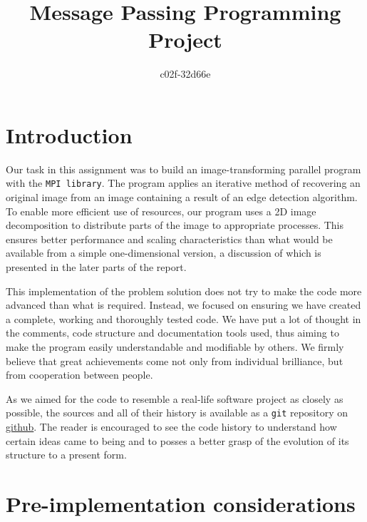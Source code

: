 \documentclass[11pt,a4paper]{article}
\begin{document}
\title{Message Passing Programming Project}
\author{c02f-32d66e}
\maketitle

\section{Introduction}
Our task in this assignment was to build an image-transforming parallel program with the \texttt{MPI library}.
The program applies an iterative method of recovering an original image from an image containing a result of an edge detection algorithm. 
To enable more efficient use of resources, our program uses a 2D image decomposition to distribute parts of the image to appropriate processes. 
This ensures better performance and scaling characteristics than what would be available from a simple one-dimensional version, a discussion of which is presented in the later parts of the report.

This implementation of the problem solution does not try to make the code more advanced than what is required. 
Instead, we focused on ensuring we have created a complete, working and thoroughly tested code. 
We have put a lot of thought in the comments, code structure and documentation tools used, thus aiming to make the program easily understandable and modifiable by others. 
We firmly believe that great achievements come not only from individual brilliance, but from cooperation between people.

As we aimed for the code to resemble a real-life software project as closely as possible, the sources and all of their history is available as a \texttt{git} repository on \href{https://github.com/mkawalec/5thyear/tree/master/mpp/MPP-casestudy}{github}. The reader is encouraged to see the code history to understand how certain ideas came to being and to posses a better grasp of the evolution of its structure to a present form.

\section{Pre-implementation considerations}
\end{document}
